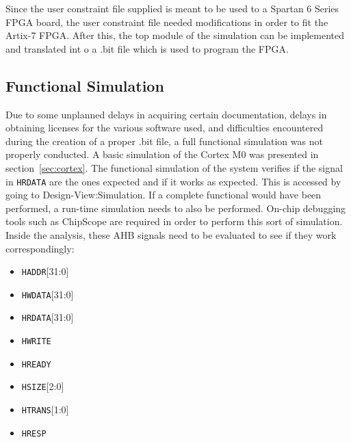 Since the user constraint file supplied is meant to be used to a Spartan 6 Series FPGA board, the user constraint file needed modifications in order to fit the Artix-7 FPGA. After this, the top module of the simulation can be implemented and translated int o a .bit file which is used to program the FPGA.

\subsection{Functional Simulation}
Due to some unplanned delays in acquiring certain documentation, delays in obtaining licenses for the various software used, and difficulties encountered during the creation of a proper .bit file, a full functional simulation was not properly conducted. A basic simulation of the Cortex M0 was presented in section~\ref{sec:cortex}.  The functional simulation of the system verifies if the signal in \verb|HRDATA| are the ones expected and if it works as expected. This is accessed by going to Design-View:Simulation. If a complete functional would have been performed, a run-time simulation needs to also be performed. On-chip debugging tools such as ChipScope are required in order to perform this sort of simulation. Inside the analysis, these AHB signals need to be evaluated to see if they work correspondingly: 
\begin{itemize}
\item \verb|HADDR|[31:0] 
\item \verb|HWDATA|[31:0]
\item \verb|HRDATA|[31:0]
\item \verb|HWRITE|
\item \verb|HREADY|
\item \verb|HSIZE|[2:0]
\item \verb|HTRANS|[1:0]
\item \verb|HRESP|
\end{itemize}
